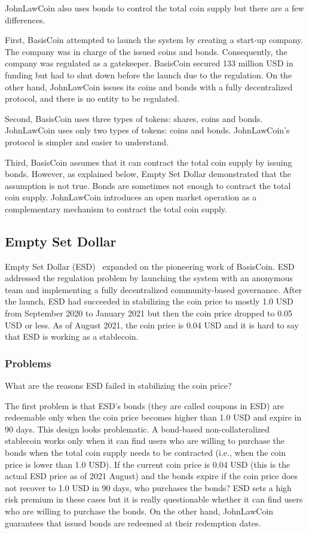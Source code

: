 \documentclass[dvipdfmx,a4paper]{article}
\begin{document}
JohnLawCoin also uses bonds to control the total coin supply but there are a few differences.

First, BasisCoin attempted to launch the system by creating a start-up company. The company was in charge of the issued coins and bonds. Consequently, the company was regulated as a gatekeeper. BasisCoin secured 133 million USD in funding but had to shut down before the launch due to the regulation. On the other hand, JohnLawCoin issues its coins and bonds with a fully decentralized protocol, and there is no entity to be regulated.

Second, BasisCoin uses three types of tokens: shares, coins and bonds. JohnLawCoin uses only two types of tokens: coins and bonds. JohnLawCoin's protocol is simpler and easier to understand.

Third, BasisCoin assumes that it can contract the total coin supply by issuing bonds. However, as explained below, Empty Set Dollar demonstrated that the assumption is not true. Bonds are sometimes not enough to contract the total coin supply. JohnLawCoin introduces an open market operation as a complementary mechanism to contract the total coin supply.

\subsection{Empty Set Dollar}

Empty Set Dollar (ESD)~\cite{emptysetdollar} expanded on the pioneering work of BasisCoin. ESD addressed the regulation problem by launching the system with an anonymous team and implementing a fully decentralized community-based governance. After the launch, ESD had succeeded in stabilizing the coin price to mostly 1.0 USD from September 2020 to January 2021 but then the coin price dropped to 0.05 USD or less. As of August 2021, the coin price is 0.04 USD and it is hard to say that ESD is working as a stablecoin.

\subsubsection{Problems}

What are the reasons ESD failed in stabilizing the coin price?

The first problem is that ESD's bonds (they are called coupons in ESD) are redeemable only when the coin price becomes higher than 1.0 USD and expire in 90 days. This design looks problematic. A bond-based non-collateralized stablecoin works only when it can find users who are willing to purchase the bonds when the total coin supply needs to be contracted (i.e., when the coin price is lower than 1.0 USD). If the current coin price is 0.04 USD (this is the actual ESD price as of 2021 August) and the bonds expire if the coin price does not recover to 1.0 USD in 90 days, who purchases the bonds? ESD sets a high risk premium in these cases but it is really questionable whether it can find users who are willing to purchase the bonds. On the other hand, JohnLawCoin guarantees that issued bonds are redeemed at their redemption dates.
\end{document}
